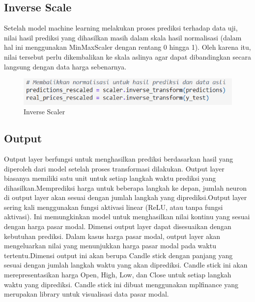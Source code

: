 



\subsection{Inverse Scale}
Setelah model machine learning melakukan proses prediksi terhadap data uji, nilai hasil prediksi yang dihasilkan masih dalam skala hasil normalisasi (dalam hal ini menggunakan MinMaxScaler dengan rentang 0 hingga 1). Oleh karena itu, nilai tersebut perlu dikembalikan ke skala aslinya agar dapat dibandingkan secara langsung dengan data harga sebenarnya.

\begin{figure} [H] \centering
    \includegraphics[scale=1.0]{gambar/inverse scaler.png} 
    \caption{Inverse Scaler}
    \label{fig:InverseScaler}
\end{figure}


\subsection{Output}
Output layer berfungsi untuk menghasilkan prediksi berdasarkan hasil yang diperoleh dari model setelah proses transformasi dilakukan. Output layer biasanya memiliki satu unit untuk setiap langkah waktu prediksi yang dihasilkan.Memprediksi harga untuk beberapa langkah ke depan, jumlah neuron di output layer akan sesuai dengan jumlah langkah yang diprediksi.Output layer sering kali menggunakan fungsi aktivasi linear (ReLU, atau tanpa fungsi aktivasi). Ini memungkinkan model untuk menghasilkan nilai kontinu yang sesuai dengan harga pasar modal. Dimensi output layer dapat disesuaikan dengan kebutuhan prediksi. Dalam kasus harga pasar modal, output layer akan mengeluarkan nilai yang menunjukkan harga pasar modal pada waktu tertentu.Dimensi output ini akan berupa Candle stick dengan panjang yang sesuai dengan jumlah langkah waktu yang akan diprediksi. Candle stick ini akan merepresentasikan harga Open, High, Low, dan Close untuk setiap langkah waktu yang diprediksi. Candle stick ini dibuat menggunakan mplfinance yang merupakan library untuk visualisasi data pasar modal.

